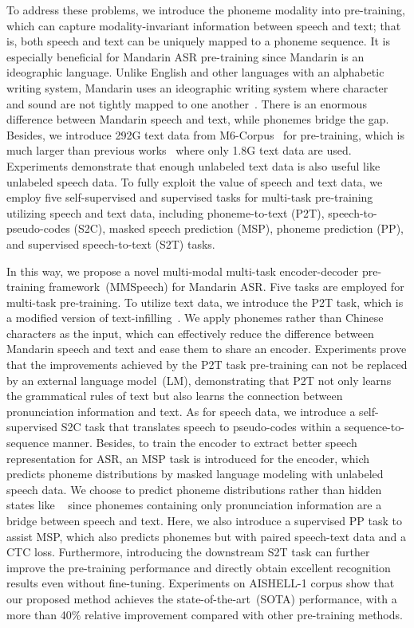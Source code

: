 \documentclass{article}
\begin{document}
To address these problems, we introduce the phoneme modality into pre-training, which can capture modality-invariant information between speech and text; that is, both speech and text can be uniquely mapped to a phoneme sequence. It is especially beneficial for Mandarin ASR pre-training since Mandarin is an ideographic language. Unlike English and other languages with an alphabetic writing system, Mandarin uses an ideographic writing system where character and sound are not tightly mapped to one another~\cite{zhou2015homophone}. There is an enormous difference between Mandarin speech and text, while phonemes bridge the gap.
Besides, we introduce 292G text data from M6-Corpus~\cite{lin2021m6} for pre-training, which is much larger than previous works~\cite{ao2021speecht5,Tang2021AGM,tang2022unified} where only 1.8G text data are used. Experiments demonstrate that enough unlabeled text data is also useful like unlabeled speech data. 
To fully exploit the value of speech and text data, we employ five self-supervised and supervised tasks for multi-task pre-training utilizing speech and text data, including phoneme-to-text (P2T), speech-to-pseudo-codes (S2C), masked speech prediction (MSP),  phoneme prediction (PP), and supervised speech-to-text (S2T) tasks.


In this way, we propose a novel multi-modal multi-task encoder-decoder pre-training framework~(MMSpeech) for Mandarin ASR. Five tasks are employed for multi-task pre-training. 
To utilize text data, we introduce the P2T task, which is a modified version of text-infilling~\cite{lewis2019bart,ao2021speecht5}. We apply phonemes rather than Chinese characters as the input, which can effectively reduce the difference between Mandarin speech and text and ease them to share an encoder.
Experiments prove that the improvements achieved by the P2T task pre-training can not be replaced by an external language model~(LM), demonstrating that P2T not only learns the grammatical rules of text but also learns the connection between pronunciation information and text.
As for speech data, we introduce a self-supervised S2C task that translates speech to pseudo-codes within a sequence-to-sequence manner. Besides, to train the encoder to extract better speech representation for ASR, an MSP task is introduced for the encoder, which predicts phoneme distributions by masked language modeling with unlabeled speech data. We choose to predict phoneme distributions rather than hidden states like ~\cite{baevski2020wav2vec,hsu2021hubert,baevski2022data2vec} since phonemes containing only pronunciation information are a bridge between speech and text. Here, we also introduce a supervised PP task to assist MSP, which also predicts phonemes but with paired speech-text data and a CTC loss.
Furthermore, introducing the downstream S2T task can further improve the pre-training performance and directly obtain excellent recognition results even without fine-tuning. 
Experiments on AISHELL-1 corpus show that our proposed method achieves the state-of-the-art~(SOTA) performance, with a more than 40\% relative improvement compared with other pre-training methods.
\end{document}
